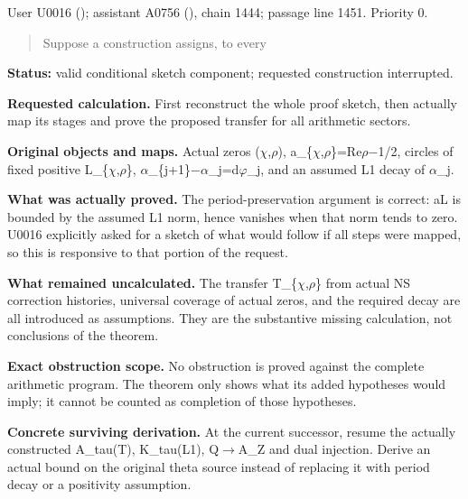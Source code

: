 User U0016 (\protect{});
assistant A0756 (\protect{}),
chain 1444; passage line 1451. Priority 0.

\begin{quote}
Suppose a construction assigns, to every
\end{quote}

\textbf{Status:} valid conditional sketch component; requested
construction interrupted.

\textbf{Requested calculation.} First reconstruct the whole proof
sketch, then actually map its stages and prove the proposed transfer for
all arithmetic sectors.

\textbf{Original objects and maps.} Actual zeros
(\allowbreak{}\ensuremath{χ}\allowbreak{},\allowbreak{}\ensuremath{ρ}\allowbreak{}),
a\_\{\allowbreak{}\ensuremath{χ}\allowbreak{},\allowbreak{}\ensuremath{ρ}\allowbreak{}\}=Re\allowbreak{}\ensuremath{ρ}\allowbreak{}\allowbreak{}\ensuremath{−}\allowbreak{}1/2,
circles of fixed positive
L\_\{\allowbreak{}\ensuremath{χ}\allowbreak{},\allowbreak{}\ensuremath{ρ}\allowbreak{}\},
\allowbreak{}\ensuremath{α}\allowbreak{}\_\{j+1\}\allowbreak{}\ensuremath{−}\allowbreak{}\allowbreak{}\ensuremath{α}\allowbreak{}\_j=d\allowbreak{}\ensuremath{φ}\allowbreak{}\_j,
and an assumed L1 decay of \allowbreak{}\ensuremath{α}\allowbreak{}\_j.

\textbf{What was actually proved.} The period-preservation argument is
correct: \textbar a\textbar L is bounded by the assumed L1 norm, hence
vanishes when that norm tends to zero. U0016 explicitly asked for a
sketch of what would follow if all steps were mapped, so this is
responsive to that portion of the request.

\textbf{What remained uncalculated.} The transfer
T\_\{\allowbreak{}\ensuremath{χ}\allowbreak{},\allowbreak{}\ensuremath{ρ}\allowbreak{}\}
from actual NS correction histories, universal coverage of actual zeros,
and the required decay are all introduced as assumptions. They are the
substantive missing calculation, not conclusions of the theorem.

\textbf{Exact obstruction scope.} No obstruction is proved against the
complete arithmetic program. The theorem only shows what its added
hypotheses would imply; it cannot be counted as completion of those
hypotheses.

\textbf{Concrete surviving derivation.} At the current successor, resume
the actually constructed A\_tau(T), K\_tau(L1),
Q\allowbreak{}\ensuremath{→}\allowbreak{}A\_Z and dual injection. Derive
an actual bound on the original theta source instead of replacing it
with period decay or a positivity assumption.


